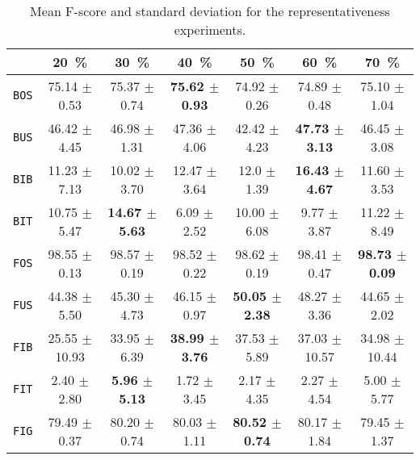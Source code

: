         \begin{table}
            \footnotesize
            \begin{tabular}{c c c c c c c}
                \toprule
                & \textbf{\SI{20}{\percent}} & \textbf{\SI{30}{\percent}} & \textbf{\SI{40}{\percent}} & \textbf{\SI{50}{\percent}} & \textbf{\SI{60}{\percent}} & \textbf{\SI{70}{\percent}}\\
                \midrule
                \texttt{BOS} & 75.14 $\pm$ 0.53 & 75.37 $\pm$ 0.74 & \textbf{75.62 $\pm$ 0.93} & 74.92 $\pm$ 0.26 & 74.89 $\pm$ 0.48 & 75.10 $\pm$ 1.04 \\
                \midrule
                \texttt{BUS} & 46.42 $\pm$ 4.45 & 46.98 $\pm$ 1.31 & 47.36 $\pm$ 4.06 & 42.42 $\pm$ 4.23 & \textbf{47.73 $\pm$ 3.13} & 46.45 $\pm$ 3.08 \\
                \midrule
                \texttt{BIB} & 11.23 $\pm$ 7.13 & 10.02 $\pm$ 3.70 & 12.47 $\pm$ 3.64 & 12.0 $\pm$ 1.39 & \textbf{16.43 $\pm$ 4.67} & 11.60 $\pm$ 3.53 \\
                \midrule
                \texttt{BIT} & 10.75 $\pm$ 5.47 & \textbf{14.67 $\pm$ 5.63} & 6.09 $\pm$ 2.52 & 10.00 $\pm$ 6.08 & 9.77 $\pm$ 3.87 & 11.22 $\pm$ 8.49 \\
                \midrule
                \midrule
                \texttt{FOS} & 98.55 $\pm$ 0.13 & 98.57 $\pm$ 0.19 & 98.52 $\pm$ 0.22 & 98.62 $\pm$ 0.19 & 98.41 $\pm$ 0.47 & \textbf{98.73 $\pm$ 0.09} \\
                \midrule
                \texttt{FUS} & 44.38 $\pm$ 5.50 & 45.30 $\pm$ 4.73 & 46.15 $\pm$ 0.97 & \textbf{50.05 $\pm$ 2.38} & 48.27 $\pm$ 3.36 & 44.65 $\pm$ 2.02 \\
                \midrule
                \texttt{FIB} & 25.55 $\pm$ 10.93 & 33.95 $\pm$ 6.39 &\textbf{ 38.99 $\pm$ 3.76} & 37.53 $\pm$ 5.89 & 37.03 $\pm$ 10.57 & 34.98 $\pm$ 10.44 \\
                \midrule
                \texttt{FIT} & 2.40 $\pm$ 2.80 & \textbf{5.96 $\pm$ 5.13} & 1.72 $\pm$ 3.45 & 2.17 $\pm$ 4.35 & 2.27 $\pm$ 4.54 & 5.00 $\pm$ 5.77 \\
                \midrule
                \texttt{FIG} & 79.49 $\pm$ 0.37 & 80.20 $\pm$ 0.74 & 80.03 $\pm$ 1.11 & \textbf{80.52 $\pm$ 0.74} & 80.17 $\pm$ 1.84 & 79.45 $\pm$ 1.37 \\
                \bottomrule
            \end{tabular}
            \caption{
                \label{tab::f_score_representativeness_f3} Mean F-score and standard deviation for the representativeness experiments.
            }
        \end{table}

